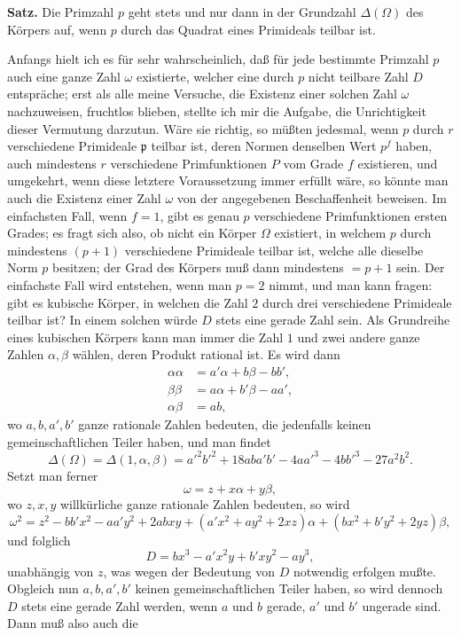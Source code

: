 \documentclass[11pt]{article}
\newcommand{\origpage}[1]{\par\vspace{0.25em}\noindent{\footnotesize\itshape [Gedruckte Seite #1]}\par\vspace{0.25em}}
\newcommand{\ideal}[1]{\mathfrak{#1}}
\begin{document}
\medskip
\noindent\textbf{Satz.} Die Primzahl $p$ geht stets und nur dann in der Grundzahl $\Delta(\Omega)$ des Körpers auf, wenn $p$ durch das Quadrat eines Primideals teilbar ist.

\origpage{405}
Anfangs hielt ich es für sehr wahrscheinlich, daß für jede bestimmte Primzahl $p$ auch eine ganze Zahl $\omega$ existierte, welcher eine durch $p$ nicht teilbare Zahl $D$ entspräche; erst als alle meine Versuche, die Existenz einer solchen Zahl $\omega$ nachzuweisen, fruchtlos blieben, stellte ich mir die Aufgabe, die Unrichtigkeit dieser Vermutung darzutun. Wäre sie richtig, so müßten jedesmal, wenn $p$ durch $r$ verschiedene Primideale $\ideal{p}$ teilbar ist, deren Normen denselben Wert $p^f$ haben, auch mindestens $r$ verschiedene Primfunktionen $P$ vom Grade $f$ existieren, und umgekehrt, wenn diese letztere Voraussetzung immer erfüllt wäre, so könnte man auch die Existenz einer Zahl $\omega$ von der angegebenen Beschaffenheit beweisen. Im einfachsten Fall, wenn $f=1$, gibt es genau $p$ verschiedene Primfunktionen ersten Grades; es fragt sich also, ob nicht ein Körper $\Omega$ existiert, in welchem $p$ durch mindestens $(p+1)$ verschiedene Primideale teilbar ist, welche alle dieselbe Norm $p$ besitzen; der Grad des Körpers muß dann mindestens $=p+1$ sein. Der einfachste Fall wird entstehen, wenn man $p=2$ nimmt, und man kann fragen: gibt es kubische Körper, in welchen die Zahl $2$ durch drei verschiedene Primideale teilbar ist? In einem solchen würde $D$ stets eine gerade Zahl sein. Als Grundreihe eines kubischen Körpers kann man immer die Zahl $1$ und zwei andere ganze Zahlen $\alpha,\beta$ wählen, deren Produkt rational ist. Es wird dann
\[
\begin{aligned}
\alpha\alpha &= a'\alpha+b\beta-bb',\\
\beta\beta &= a\alpha+b'\beta-aa',\\
\alpha\beta &= ab,
\end{aligned}
\]
wo $a,b,a',b'$ ganze rationale Zahlen bedeuten, die jedenfalls keinen gemeinschaftlichen Teiler haben, und man findet
\[
\Delta(\Omega)=\Delta(1,\alpha,\beta)=a'^2b'^2+18aba'b'-4aa'^3-4bb'^3-27a^2b^2.
\]
Setzt man ferner
\[
\omega=z+x\alpha+y\beta,
\]
wo $z,x,y$ willkürliche ganze rationale Zahlen bedeuten, so wird
\[
\omega^2=z^2-bb'x^2-aa'y^2+2abxy+(a'x^2+ay^2+2xz)\alpha+(bx^2+b'y^2+2yz)\beta,
\]
und folglich
\[
D=bx^3-a'x^2y+b'xy^2-ay^3,
\]
unabhängig von $z$, was wegen der Bedeutung von $D$ notwendig erfolgen mußte. Obgleich nun $a,b,a',b'$ keinen gemeinschaftlichen Teiler haben, so wird dennoch $D$ stets eine gerade Zahl werden, wenn $a$ und $b$ gerade, $a'$ und $b'$ ungerade sind. Dann muß also auch die
\end{document}
